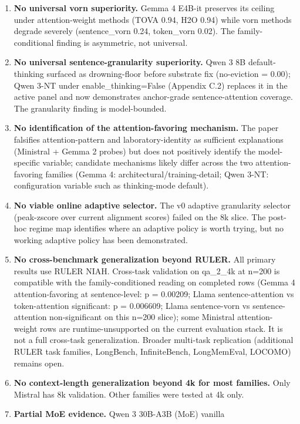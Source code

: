 \documentclass[10pt]{article}
\begin{document}
\begin{enumerate}
\def\labelenumi{\arabic{enumi}.}
\item
 \textbf{No universal vorn superiority.} Gemma 4 E4B-it
 preserves its ceiling under attention-weight methods (TOVA 0.94,
 H2O 0.94) while vorn methods degrade severely
 (sentence\_vorn 0.24, token\_vorn 0.02). The family-conditional
 finding is asymmetric, not universal.
\item
 \textbf{No universal sentence-granularity superiority.} Qwen 3 8B
 default-thinking surfaced as drowning-floor before substrate fix
 (no-eviction = 0.00); Qwen 3-NT under enable\_thinking=False
 (Appendix C.2) replaces it in the active panel and now demonstrates
 anchor-grade sentence-attention coverage. The granularity finding
 is model-bounded.
\item
 \textbf{No identification of the attention-favoring mechanism.} The
 paper falsifies attention-pattern and laboratory-identity as
 sufficient explanations (Ministral + Gemma 2 probes) but does not
 positively identify the model-specific variable; candidate mechanisms
 likely differ across the two attention-favoring families (Gemma 4:
 architectural/training-detail; Qwen 3-NT: configuration variable
 such as thinking-mode default).
\item
 \textbf{No viable online adaptive selector.} The v0 adaptive
 granularity selector (peak-zscore over current alignment scores)
 failed on the 8k slice. The post-hoc regime map identifies where an
 adaptive policy is worth trying, but no working adaptive policy has
 been demonstrated.
\item
 \textbf{No cross-benchmark generalization beyond RULER.} All primary
 results use RULER NIAH. Cross-task validation on qa\_2\_4k at n=200
 is compatible with the family-conditioned reading on completed rows
 (Gemma 4 attention-favoring at sentence-level: p = 0.00209;
 Llama sentence-attention vs token-attention significant: p =
 0.006609; Llama sentence-vorn vs sentence-attention non-significant
 on this n=200 slice); some Ministral attention-weight rows are
 runtime-unsupported on the current evaluation stack. It is not a
 full cross-task generalization. Broader multi-task replication
 (additional RULER task families, LongBench, InfiniteBench,
 LongMemEval, LOCOMO) remains open.
\item
 \textbf{No context-length generalization beyond 4k for most families.}
 Only Mistral has 8k validation. Other families were tested at 4k only.
\item
 \textbf{Partial MoE evidence.} Qwen 3 30B-A3B (MoE) vanilla

\end{enumerate}
\end{document}
